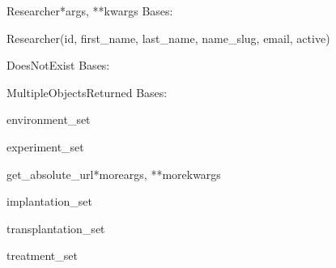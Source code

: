 \documentclass[letterpaper,10pt,english]{sphinxmanual}
\begin{document}
\hypertarget{data.models.Researcher}{}\begin{classdesc}{Researcher}{*args, **kwargs}
Bases: 

Researcher(id, first\_name, last\_name, name\_slug, email, active)

\hypertarget{data.models.Researcher.DoesNotExist}{}\begin{excdesc}{DoesNotExist}
Bases: 
\end{excdesc}

\hypertarget{data.models.Researcher.MultipleObjectsReturned}{}\begin{excdesc}{MultipleObjectsReturned}
Bases: 
\end{excdesc}

\hypertarget{data.models.Researcher.environment\_set}{}\begin{memberdesc}[Researcher]{environment\_set}\end{memberdesc}

\hypertarget{data.models.Researcher.experiment\_set}{}\begin{memberdesc}[Researcher]{experiment\_set}\end{memberdesc}

\hypertarget{data.models.Researcher.get\_absolute\_url}{}\begin{methoddesc}[Researcher]{get\_absolute\_url}{*moreargs, **morekwargs}\end{methoddesc}

\hypertarget{data.models.Researcher.implantation\_set}{}\begin{memberdesc}[Researcher]{implantation\_set}\end{memberdesc}

\hypertarget{data.models.Researcher.transplantation\_set}{}\begin{memberdesc}[Researcher]{transplantation\_set}\end{memberdesc}

\hypertarget{data.models.Researcher.treatment\_set}{}\begin{memberdesc}[Researcher]{treatment\_set}\end{memberdesc}
\end{classdesc}
\end{document}
